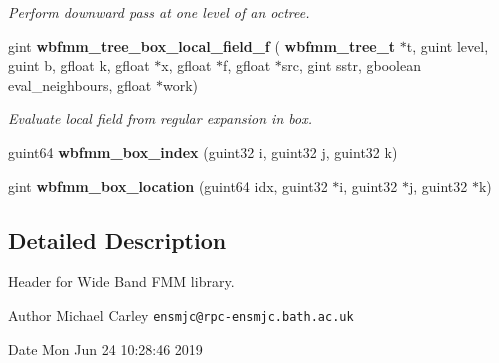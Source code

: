 \begin{DoxyCompactItemize}
\begin{DoxyCompactList}\small\item\em Perform downward pass at one level of an octree. \end{DoxyCompactList}\item 
gint \textbf{ wbfmm\+\_\+tree\+\_\+box\+\_\+local\+\_\+field\+\_\+f} (\textbf{ wbfmm\+\_\+tree\+\_\+t} $\ast$t, guint level, guint b, gfloat k, gfloat $\ast$x, gfloat $\ast$f, gfloat $\ast$src, gint sstr, gboolean eval\+\_\+neighbours, gfloat $\ast$work)
\begin{DoxyCompactList}\small\item\em Evaluate local field from regular expansion in box. \end{DoxyCompactList}\item 
guint64 \textbf{ wbfmm\+\_\+box\+\_\+index} (guint32 i, guint32 j, guint32 k)
\item 
gint \textbf{ wbfmm\+\_\+box\+\_\+location} (guint64 idx, guint32 $\ast$i, guint32 $\ast$j, guint32 $\ast$k)
\end{DoxyCompactItemize}


\subsection{Detailed Description}
Header for Wide Band F\+MM library. 

\begin{DoxyAuthor}{Author}
Michael Carley {\tt ensmjc@rpc-\/ensmjc.\+bath.\+ac.\+uk} 
\end{DoxyAuthor}
\begin{DoxyDate}{Date}
Mon Jun 24 10\+:28\+:46 2019 
\end{DoxyDate}
